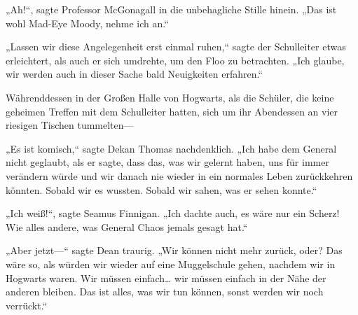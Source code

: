 „Ah!“, sagte Professor McGonagall in die unbehagliche Stille hinein. „Das ist wohl Mad-Eye Moody, nehme ich an.“

„Lassen wir diese Angelegenheit erst einmal ruhen,“ sagte der Schulleiter etwas erleichtert, als auch er sich umdrehte, um den Floo zu betrachten. „Ich glaube, wir werden auch in dieser Sache bald Neuigkeiten erfahren.“


Währenddessen in der Großen Halle von Hogwarts, als die Schüler, die keine geheimen Treffen mit dem Schulleiter hatten, sich um ihr Abendessen an vier riesigen Tischen tummelten—

„Es ist komisch,“ sagte Dekan Thomas nachdenklich. „Ich habe dem General nicht geglaubt, als er sagte, dass das, was wir gelernt haben, uns für immer verändern würde und wir danach nie wieder in ein normales Leben zurückkehren könnten. Sobald wir es wussten. Sobald wir sahen, was er sehen konnte.“

„Ich weiß!“, sagte Seamus Finnigan. „Ich dachte auch, es wäre nur ein Scherz! Wie alles andere, was General Chaos jemals gesagt hat.“

„Aber jetzt—“ sagte Dean traurig. „Wir können nicht mehr zurück, oder? Das wäre so, als würden wir wieder auf eine Muggelschule gehen, nachdem wir in Hogwarts waren. Wir müssen einfach… wir müssen einfach in der Nähe der anderen bleiben. Das ist alles, was wir tun können, sonst werden wir noch verrückt.“

